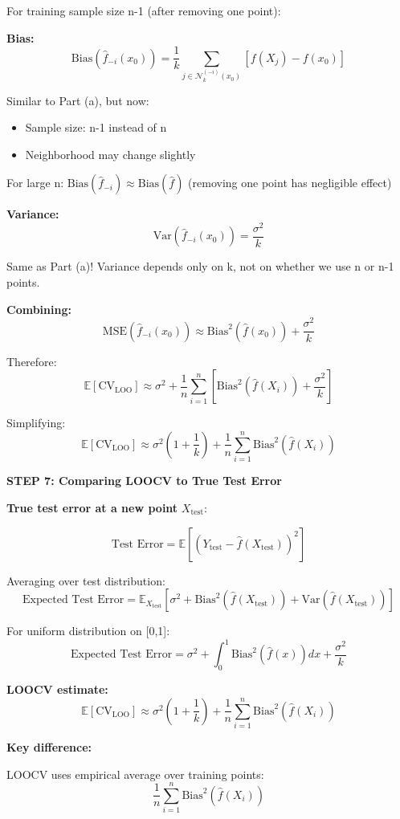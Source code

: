 \documentclass[12pt]{article}
\begin{document}
\begin{solution}
For training sample size n-1 (after removing one point):

\textbf{Bias:}
\[
\text{Bias}(\hat{f}_{-i}(x_0)) = \frac{1}{k}\sum_{j \in \mathcal{N}_k^{(-i)}(x_0)} [f(X_j) - f(x_0)]
\]

Similar to Part (a), but now:
\begin{itemize}
    \item Sample size: n-1 instead of n
    \item Neighborhood may change slightly
\end{itemize}

For large n: $\text{Bias}(\hat{f}_{-i}) \approx \text{Bias}(\hat{f})$ (removing one point has negligible effect)

\textbf{Variance:}
\[
\text{Var}(\hat{f}_{-i}(x_0)) = \frac{\sigma^2}{k}
\]

Same as Part (a)! Variance depends only on k, not on whether we use n or n-1 points.

\textbf{Combining:}
\[
\text{MSE}(\hat{f}_{-i}(x_0)) \approx \text{Bias}^2(\hat{f}(x_0)) + \frac{\sigma^2}{k}
\]

Therefore:
\[
\mathbb{E}[\text{CV}_{\text{LOO}}] \approx \sigma^2 + \frac{1}{n}\sum_{i=1}^n \left[\text{Bias}^2(\hat{f}(X_i)) + \frac{\sigma^2}{k}\right]
\]

Simplifying:
\[
\boxed{
\mathbb{E}[\text{CV}_{\text{LOO}}] \approx \sigma^2\left(1 + \frac{1}{k}\right) + \frac{1}{n}\sum_{i=1}^n \text{Bias}^2(\hat{f}(X_i))
}
\]

\textbf{STEP 7: Comparing LOOCV to True Test Error}

\textbf{True test error at a new point } $X_{\text{test}}$:

\[
\text{Test Error} = \mathbb{E}\left[(Y_{\text{test}} - \hat{f}(X_{\text{test}}))^2\right]
\]

Averaging over test distribution:
\[
\text{Expected Test Error} = \mathbb{E}_{X_{\text{test}}}\left[\sigma^2 + \text{Bias}^2(\hat{f}(X_{\text{test}})) + \text{Var}(\hat{f}(X_{\text{test}}))\right]
\]

For uniform distribution on [0,1]:
\[
\text{Expected Test Error} = \sigma^2 + \int_0^1 \text{Bias}^2(\hat{f}(x))dx + \frac{\sigma^2}{k}
\]

\textbf{LOOCV estimate:}
\[
\mathbb{E}[\text{CV}_{\text{LOO}}] \approx \sigma^2\left(1 + \frac{1}{k}\right) + \frac{1}{n}\sum_{i=1}^n \text{Bias}^2(\hat{f}(X_i))
\]

\textbf{Key difference:}

LOOCV uses empirical average over training points:
\[
\frac{1}{n}\sum_{i=1}^n \text{Bias}^2(\hat{f}(X_i))
\]


\end{solution}
\end{document}
